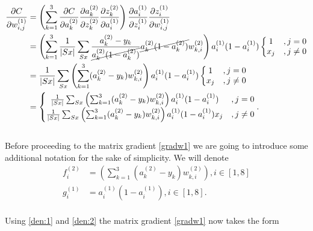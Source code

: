 \documentclass[12pt,titlepage]{article}
\begin{document}
\begin{equation} \label{der1}
\begin{split}
\frac{\partial C}{\partial w_{i,j}^{(1)}}
&=\left( \sum_{k=1}^{3}\frac{\partial C}{\partial a_{k}^{(2)}}\frac{\partial a_{k}^{(2)}}{\partial z_{k}^{(2)}}\frac{\partial z_{k}^{(2)}}{\partial a_{i}^{(1)}}\right )\frac{\partial a_{i}^{(1)}}{\partial z_{i}^{(1)}}\frac{\partial z_{i}^{(1)}}{\partial w_{i,j}^{(1)}}\\
&=\left(\sum_{k=1}^{3} \frac{1}{|Sx|}\sum_{Sx} \frac{a_{k}^{(2)}-y_{k}}{\cancel{a_{k}^{(2)}(1-a_{k}^{(2)})}}\cancel{a_{k}^{(2)}(1-a_{k}^{(2)})}w_{k,i}^{(2)}\right )a_{i}^{(1)}(1-a_{i}^{(1)})\left\{\begin{matrix}
1&, j = 0\\ 
x_{j}&, j \neq 0
\end{matrix}\right.\\
&=\frac{1}{|Sx|}\sum_{Sx}\left(\sum_{k=1}^{3} (a_{k}^{(2)}-y_{k})w_{k,i}^{(2)}\right )a_{i}^{(1)}(1-a_{i}^{(1)})\left\{\begin{matrix}
1&, j = 0\\ 
x_{j}&, j \neq 0
\end{matrix}\right.\\
&=\left\{\begin{matrix}
\frac{1}{|Sx|}\sum_{Sx}\left(\sum_{k=1}^{3} (a_{k}^{(2)}-y_{k})w_{k,i}^{(2)}\right )a_{i}^{(1)}(1-a_{i}^{(1)})&, j = 0\\ 
\frac{1}{|Sx|}\sum_{Sx}\left(\sum_{k=1}^{3} (a_{k}^{(2)}-y_{k})w_{k,i}^{(2)}\right )a_{i}^{(1)}(1-a_{i}^{(1)})x_{j}&, j \neq 0
\end{matrix}\right..
\end{split}
\end{equation}
\\Before proceeding to the matrix gradient \eqref{gradw1} we are going to introduce some additional notation for the sake of simplicity. We will denote
\begin{subequations}
\begin{align}
f_{i}^{(2)}&=\left(\sum_{k=1}^{3} (a_{k}^{(2)}-y_{k})w_{k,i}^{(2)}\right ), i \in [1,8] \label{den:1}\\
g_{i}^{(1)}&=a_{i}^{(1)}(1-a_{i}^{(1)}), i \in [1,8]. \label{den:2}
\end{align}
\end{subequations}
\\Using \eqref{den:1} and \eqref{den:2} the matrix gradient \eqref{gradw1} now takes the form
\end{document}

